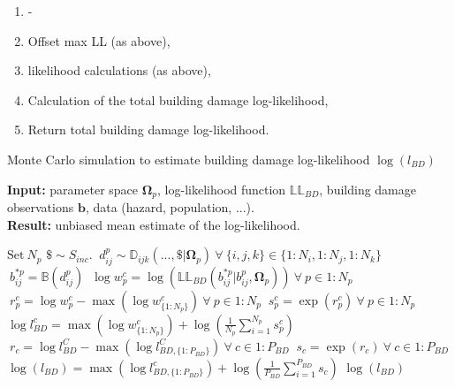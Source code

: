 \documentclass[10pt,a4paper]{article}
\begin{document}
\begin{multicols}{1}
\begin{enumerate}
\item -
\item Offset max LL (as above),
\item likelihood calculations (as above),
\item Calculation of the total building damage log-likelihood,
\item Return total building damage log-likelihood.
\end{enumerate}
\begin{algorithm}[H]
\caption{\label{alg:LBD} Monte Carlo simulation to estimate building damage log-likelihood $\log(l_{BD})$}
    \hspace*{\algorithmicindent} \textbf{Input:} parameter space $\boldsymbol{\Omega}_p$, log-likelihood function $\mathbb{LL}_{BD}$, building damage observations $\boldsymbol{b}$, data (hazard, population, ...).  \\
    \hspace*{\algorithmicindent} \textbf{Result:} unbiased mean estimate of the log-likelihood.
    
\begin{algorithmic}[1]
\begin{spacing}{1.5}
\STATE $\text{Set} \ N_p $
    \STATE $\$\sim S_{inc}$.
         \STATE $\ d_{ij}^{p} \sim \mathbb{D}_{ijk}(...,\$|\boldsymbol{\Omega}_p) \ \forall \ \{i,j,k\} \in \{1:N_{i},1:N_{j},1:N_{k}\} $
         \STATE $\ b_{ij}^{*p} = \mathbb{B}(d_{ij}^{p}) $      
         \ENDFOR
     \STATE $\ \log{w^c_{p}}= \log\left(\mathbb{LL}_{BD}(b_{ij}^{*p}|b_{ij}^{p},\boldsymbol{\Omega}_p)\right)\  \forall \ p \in 1:N_p$      
     \STATE $ \ r^c_p = \log{w^c_p} - \max{(\log{w^c_{\{1:N_p\}}})} \  \forall \ p \in 1:N_p $
     \STATE $ \ s^c_p = \exp{(r^c_p)} \  \forall \ p \in 1:N_p $
     \STATE $\log{l^c_{BD}} = \max{(\log{w^c_{\{1:N_p\}}})} + \log{(\frac{1}{N_p}\sum_{i=1}^{N_p} s^c_p)}$ 
\ENDFOR
\STATE $ \ r_c = \log{l^C_{BD}} - \max{(\log{l^C_{BD,{\{1:P_{BD}\}}}})} \  \forall \ c \in 1:P_{BD} $
     \STATE $ \ s_c = \exp{(r_c)} \  \forall \ c \in 1:P_{BD} $
     \STATE $\log(l_{BD}) = \max{(\log{l^c_{BD,\{1:P_{BD}\}}})} + \log{(\frac{1}{P_{BD}}\sum_{i=1}^{P_{BD}} s_c)}$ 
\RETURN $\log(l_{BD})$
\end{spacing}
\end{algorithmic}
\end{algorithm}


\end{multicols}
\end{document}
